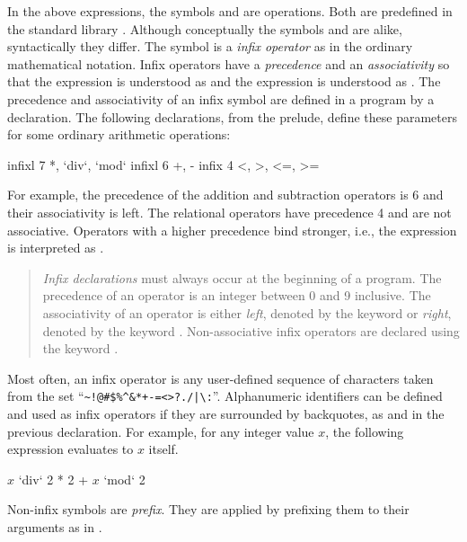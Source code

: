 In the above expressions, the symbols \ccode{+} and
 are operations.
Both are predefined in the standard library .
Although conceptually the symbols \ccode{+} and 
are alike, syntactically they differ.
The symbol \ccode{+} is a \emph{infix operator}
as in the ordinary mathematical notation.  
Infix operators have a \emph{precedence}
and an \emph{associativity}
so that the expression 
is understood as  and
the expression  is understood
as .
The precedence and associativity of an infix symbol
are defined in a program by a declaration.
The following declarations, from the prelude,
define these parameters for some ordinary arithmetic operations:
%
\begin{prog}
infixl 7 *, `div`, `mod`
infixl 6 +, -
infix  4  <, >, <=, >=
\end{prog}
%
For example, 
the precedence of the addition and subtraction operators is 6
and their associativity is left.
The relational operators have precedence 4 and are not associative.
Operators with a higher precedence bind stronger, i.e.,
the expression  is interpreted as
.
%
\begin{quote}
\emph{Infix declarations}
must always occur at the beginning of a program.
The precedence of an operator
is an integer between 0 and 9 inclusive.
The associativity of an operator is either
\emph{left}, denoted by the keyword 
or \emph{right}, denoted by the keyword .
Non-associative infix operators are declared using the 
keyword .
\end{quote}
%
Most often, an infix operator is any user-defined sequence of characters
taken from the set
``\verb`~!@#$%^&*+-=<>?./|\:`''.
Alphanumeric identifiers can be defined and used as infix operators
if they are surrounded by backquotes, as  and
 in the previous declaration.
For example, for any integer value $x$, the following expression
evaluates to $x$ itself.
%
\begin{prog}
$x$ `div` 2 * 2 + $x$ `mod` 2
\end{prog}
%
Non-infix symbols are \emph{prefix}.
They are applied by prefixing them to their arguments as in
.

